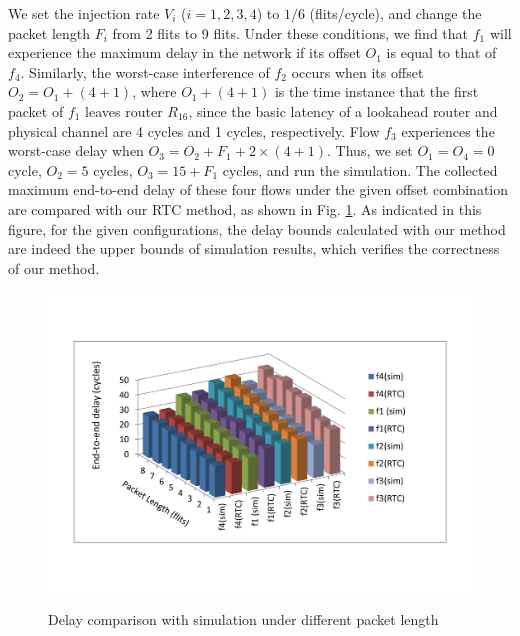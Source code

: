 \documentclass[preprint]{elsarticle}
\begin{document}
We set the injection rate $V_i$ ($i=1,2,3,4$) to $1/6$ (flits/cycle), and change the packet length $F_i$ from 2 flits to 9 flits. Under these conditions, we find that $f_1$ will experience the maximum delay in the network if its offset $O_1$ is equal to that of $f_4$. Similarly, the worst-case interference of $f_2$ occurs when its offset $O_2=O_1+(4+1)$, where $O_1+(4+1)$ is the time instance that the first packet of $f_1$ leaves router $R_{16}$, since the basic latency of a lookahead router and physical channel are 4 cycles and 1 cycles, respectively. Flow $f_3$ experiences the worst-case delay when $O_3=O_2+F_1+2\times(4+1)$. Thus, we set $O_1=O_4=0$ cycle, $O_2=5$ cycles, $O_3=15+F_1$ cycles, and run the simulation. The collected maximum end-to-end delay of these four flows under the given offset combination are compared with our RTC method, as shown in Fig. \ref{rtcvssim}. As indicated in this figure, for the given configurations, the delay bounds calculated with our method are indeed the upper bounds of simulation results, which verifies the correctness of our method.
\begin{figure}
  \centering
  \includegraphics[scale=0.5]{figures/rtcvssim.pdf}\\
  \caption{Delay comparison with simulation under different packet length}\label{rtcvssim}
\end{figure}
\end{document}
